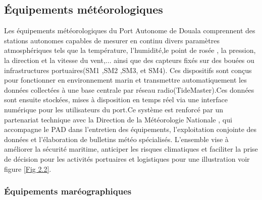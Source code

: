 \documentclass[a4paper,12pt,openany]{report}
\begin{document}
		\subsection{Équipements météorologiques}
		
		\quad Les équipements météorologiques du Port Autonome de Douala comprennent des stations autonomes capables de mesurer en continu divers paramètres atmosphériques tels que la température, l'humidité,le point de rosée , la pression, la direction et la vitesse du vent,...  ainsi que des capteurs fixés sur des bouées ou infrastructures portuaires(SM1 ,SM2 ,SM3, et SM4). Ces dispositifs sont conçus pour fonctionner en environnement marin et transmettre automatiquement les données collectées à une base centrale par réseau  radio(TideMaster).Ces données sont ensuite stockées,   mises à disposition en temps réel via une interface numérique pour les utilisateurs du port.Ce système est renforcé par un partenariat technique avec la Direction de la Météorologie Nationale  , qui accompagne le PAD dans l’entretien des équipements, l’exploitation conjointe des données et l’élaboration de bulletins météo spécialisés. L’ensemble vise à améliorer la sécurité maritime, anticiper les risques climatiques et faciliter la prise de décision pour les activités portuaires et logistiques pour une illustration voir figure \ref{Fig 2.2}. \\
		
			\subsubsection{Équipements maréographiques}
			
\end{document}
